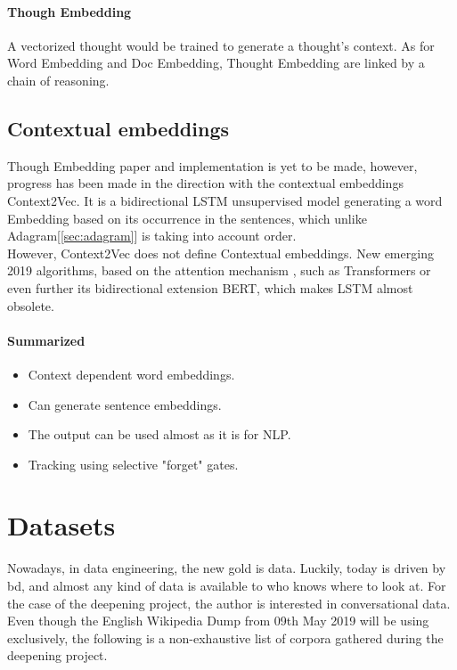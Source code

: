 \paragraph{Though Embedding}
A vectorized thought would be trained to generate a thought's context. As for Word Embedding and Doc Embedding,  Thought Embedding are linked by a chain of reasoning.

\subsection{Contextual embeddings}
Though Embedding paper and implementation is yet to be made, however, progress has been made in the direction with the contextual embeddings Context2Vec\cite{article:context2vec}. It is a bidirectional LSTM\cite{article:lstm} unsupervised model generating a word Embedding based on its occurrence in the sentences, which unlike Adagram[\ref{sec:adagram}] is taking into account order. \\


However, Context2Vec does not define Contextual embeddings. New emerging 2019 algorithms, based on the attention mechanism \cite{article:attention-is-all-you-need}, such as Transformers\cite{article:transformer} or even further its bidirectional extension BERT\cite{article:bert}, which makes LSTM almost obsolete.

\paragraph{Summarized}
\begin{itemize}
    \setlength\itemsep{0em}
    \item Context dependent word embeddings.
    \item Can generate sentence embeddings.
    \item The output can be used almost as it is for NLP.
    \item Tracking using selective "forget" gates.
\end{itemize}


\section{Datasets}
Nowadays, in data engineering, the new gold is data. Luckily, today is driven by \gls{bd}, and almost any kind of data is available to who knows where to look at. For the case of the deepening project, the author is interested in conversational data. Even though the English Wikipedia Dump from 09th May 2019 will be using exclusively, the following is a non-exhaustive list of corpora gathered during the deepening project.

